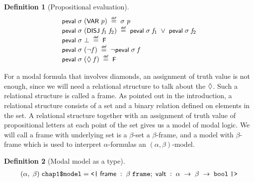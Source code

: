 \documentclass[letterpaper]{article}
\newtheorem{defn}{Definition}
\renewcommand{\HOLConst}[1]{{\textsf{\upshape\small #1}}}
\renewcommand{\HOLinline}[1]{\ensuremath{#1}}
\newenvironment{holmath}{\begin{displaymath}\begin{array}{l}}{\end{array}\end{displaymath}\ignorespacesafterend}
\begin{document}
\begin{defn}[Propositional evaluation]
\begin{holmath}
  \HOLConst{peval}\;\HOLFreeVar{\ensuremath{\sigma}}\;(\HOLConst{VAR}\;\HOLFreeVar{p})\;\HOLSymConst{\HOLTokenDefEquality{}}\;\HOLFreeVar{\ensuremath{\sigma}}\;\HOLFreeVar{p}\\
\HOLConst{peval}\;\HOLFreeVar{\ensuremath{\sigma}}\;(\HOLConst{DISJ}\;\HOLFreeVar{f\sb{\mathrm{1}}}\;\HOLFreeVar{f\sb{\mathrm{2}}})\;\HOLSymConst{\HOLTokenDefEquality{}}\;\HOLConst{peval}\;\HOLFreeVar{\ensuremath{\sigma}}\;\HOLFreeVar{f\sb{\mathrm{1}}}\;\HOLSymConst{\HOLTokenDisj{}}\;\HOLConst{peval}\;\HOLFreeVar{\ensuremath{\sigma}}\;\HOLFreeVar{f\sb{\mathrm{2}}}\\
\HOLConst{peval}\;\HOLFreeVar{\ensuremath{\sigma}}\;\HOLSymConst{\ensuremath{\bot}}\;\HOLSymConst{\HOLTokenDefEquality{}}\;\HOLConst{F}\\
\HOLConst{peval}\;\HOLFreeVar{\ensuremath{\sigma}}\;(\HOLSymConst{\HOLTokenNeg{}}\HOLFreeVar{f})\;\HOLSymConst{\HOLTokenDefEquality{}}\;\HOLSymConst{\HOLTokenNeg{}}\HOLConst{peval}\;\HOLFreeVar{\ensuremath{\sigma}}\;\HOLFreeVar{f}\\
\HOLConst{peval}\;\HOLFreeVar{\ensuremath{\sigma}}\;(\HOLSymConst{\ensuremath{\Diamond}}\;\HOLFreeVar{f})\;\HOLSymConst{\HOLTokenDefEquality{}}\;\HOLConst{F}
\end{holmath}
\end{defn}

For a modal formula that involves diamonds, an assignment of truth value is not enough, since we will need a relational structure to talk about the \HOLinline{\HOLSymConst{\ensuremath{\Diamond}}}. Such a relational structure is called a frame. As pointed out in the introduction, a relational structure consists of a set and a binary relation defined on elements in the set. A relational structure together with an assignment of truth value of propositional letters at each point of the set gives us a model of modal logic.  We will call a frame with underlying set is a $\beta$-set a $\beta$-frame, and a model with $\beta$-frame which is used to interpret $\alpha$-formulas an $(\alpha,\beta)$-model.

\begin{defn}[Modal model as a type]
\begin{holmath}
  (\ensuremath{\alpha},\;\ensuremath{\beta})\;\HOLTyOp{chap1\$model} = \HOLTokenLeftrec{}\;\HOLFieldName{frame}\;:\;\ensuremath{\beta}\;\HOLTyOp{frame};\;\HOLFieldName{valt}\;:\;\ensuremath{\alpha}\;\ensuremath{\rightarrow}\;\ensuremath{\beta}\;\ensuremath{\rightarrow}\;\HOLTyOp{bool}\;\HOLTokenRightrec{}
\end{holmath}
\end{defn}
\end{document}
